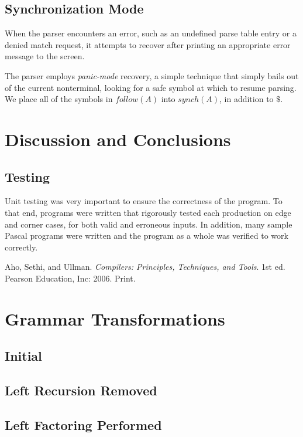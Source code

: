 \documentclass[titlepage]{article}
\begin{document}
		\subsection{Synchronization Mode}
		When the parser encounters an error, such as an undefined parse table entry or a denied match request, it attempts to recover after printing an appropriate error message to the screen.

		The parser employs \textit{panic-mode} recovery, a simple technique that simply bails out of the current nonterminal, looking for a safe symbol at which to resume parsing. We place all of the symbols in $follow(A)$ into $synch(A)$, in addition to $\$$.

	\section{Discussion and Conclusions}
		\subsection{Testing}
		Unit testing was very important to ensure the correctness of the program. To that end, programs were written that rigorously tested each production on edge and corner cases, for both valid and erroneous inputs. In addition, many sample Pascal programs were written and the program as a whole was verified to work correctly.

	\begin{thebibliography}{9}
			Aho, Sethi, and Ullman.
			\emph{Compilers: Principles, Techniques, and Tools}.
			1st ed.
			Pearson Education, Inc: 2006. Print.
	\end{thebibliography}
	\appendix
	\pagebreak
	\section{Grammar Transformations}
		\subsection{Initial}
		
		\subsection{Left Recursion Removed}
		
		\subsection{Left Factoring Performed}
		
	\pagebreak
\end{document}
